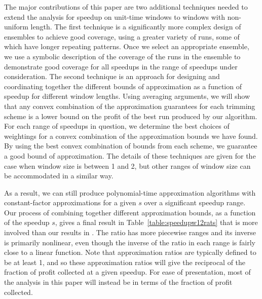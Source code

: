 \documentclass[11pt]{article}
\begin{document}
The major contributions of this paper are two additional techniques needed to extend the analysis for speedup on unit-time windows to windows with non-uniform length.  The first technique is a significantly more complex design of ensembles to achieve good coverage, using a greater variety of runs, some of which have longer repeating patterns.  Once we select an appropriate ensemble, we use a symbolic description of the coverage of the runs in the ensemble to demonstrate good coverage for all speedups in the range of speedups under consideration.  The second technique is an approach for designing and coordinating together the different bounds of approximation as a function of speedup for different window lengths.  Using averaging arguments, we will show that any convex combination of the approximation guarantees for each trimming scheme is a lower bound on the profit of the best run produced by our algorithm.  For each range of speedups in question, we determine the best choices of weightings for a convex combination of the approximation bounds we have found.  By using the best convex combination of bounds from each scheme, we guarantee a good bound of approximation.  The details of these techniques are given for the case when window size is between 1 and 2, but other ranges of window size can be accommodated in a similar way.

As a result, we can still produce polynomial-time approximation algorithms with constant-factor approximations for a given $s$ over a significant speedup range.
Our process of combining together different approximation bounds, as a function of the speedup $s$, gives a final result in Table~\ref{table:speedupw12rats} that is more involved than our results in \cite{Frederickson5}.  The ratio has more piecewise ranges and its inverse is primarily nonlinear, even though the inverse of the ratio in each range is fairly close to a linear function.  Note that approximation ratios are typically defined to be at least 1, and so these approximation ratios will give the reciprocal of the fraction of profit collected at a given speedup.  For ease of presentation, most of the analysis in this paper will instead be in terms of the fraction of profit collected.

\medskip
\end{document}

